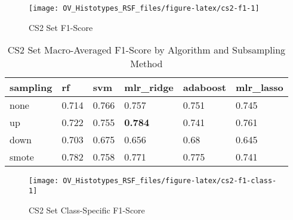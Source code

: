 \documentclass[
]{report}
\begin{document}
\begin{figure}[H]

{\centering \texttt{[image: OV\_Histotypes\_RSF\_files/figure-latex/cs2-f1-1]} 

}

\caption{CS2 Set F1-Score}\label{fig:cs2-f1}
\end{figure}

\begin{table}

\caption{\label{tab:cs2-f1-table}CS2 Set Macro-Averaged F1-Score by Algorithm and Subsampling Method}
\centering
\begin{tabular}[t]{l|l|l|l|l|l}
\hline
sampling & rf & svm & mlr\_ridge & adaboost & mlr\_lasso\\
\hline
none & 0.714 & 0.766 & 0.757 & 0.751 & 0.745\\
\hline
up & 0.722 & 0.755 & \textbf{0.784} & 0.741 & 0.761\\
\hline
down & 0.703 & 0.675 & 0.656 & 0.68 & 0.645\\
\hline
smote & 0.782 & 0.758 & 0.771 & 0.775 & 0.741\\
\hline
\end{tabular}
\end{table}

\begin{figure}[H]

{\centering \texttt{[image: OV\_Histotypes\_RSF\_files/figure-latex/cs2-f1-class-1]} 

}

\caption{CS2 Set Class-Specific F1-Score}\label{fig:cs2-f1-class}
\end{figure}
\end{document}
